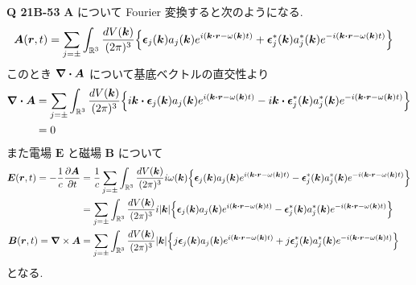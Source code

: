 \documentclass[uplatex,dvipdfmx,a4paper,11pt]{jlreq}
\newcommand{\RR}{\mathbb{R}}
\newcommand{\EE}{\bm{E}}
\newcommand{\BB}{\bm{B}}
\renewcommand{\AA}{\bm{A}}
\newcommand{\rr}{\bm{r}}
\newcommand{\kk}{\bm{k}}
\theoremstyle{definition}
\begin{document}
\textbf{Q 21B-53}
$\AA$ について Fourier 変換すると次のようになる.
\begin{align}
  \AA(\rr, t) & = \sum_{j=\pm}\int_{\RR^3}\frac{dV(\kk)}{(2\pi)^3}\qty{\ee_j(\kk)a_j(\kk)e^{i(\kk\vdot\rr - \omega(\kk)t)} + \ee_j^*(\kk)a_j^*(\kk)e^{-i(\kk\vdot\rr - \omega(\kk)t)}}
\end{align}
このとき $\vnabla\vdot\AA$ について基底ベクトルの直交性より
\begin{align}
  \vnabla\vdot\AA & = \sum_{j=\pm}\int_{\RR^3}\frac{dV(\kk)}{(2\pi)^3}\qty{i\kk\vdot\ee_j(\kk)a_j(\kk)e^{i(\kk\vdot\rr - \omega(\kk)t)} - i\kk\vdot\ee_j^*(\kk)a_j^*(\kk)e^{-i(\kk\vdot\rr - \omega(\kk)t)}} \\
                  & = 0
\end{align}
また電場 $\EE$ と磁場 $\BB$ について
\begin{align}
  \EE(\rr, t) = -\frac{1}{c}\pdv{\AA}{t} & = \frac{1}{c}\sum_{j=\pm}\int_{\RR^3}\frac{dV(\kk)}{(2\pi)^3}i\omega(\kk)\qty{\ee_j(\kk)a_j(\kk)e^{i(\kk\vdot\rr - \omega(\kk)t)} - \ee_j^*(\kk)a_j^*(\kk)e^{-i(\kk\vdot\rr - \omega(\kk)t)}} \\
                                         & = \sum_{j=\pm}\int_{\RR^3}\frac{dV(\kk)}{(2\pi)^3}i|\kk|\qty{\ee_j(\kk)a_j(\kk)e^{i(\kk\vdot\rr - \omega(\kk)t)} - \ee_j^*(\kk)a_j^*(\kk)e^{-i(\kk\vdot\rr - \omega(\kk)t)}}                  \\
  \BB(\rr, t) = \vnabla\times\AA         & = \sum_{j=\pm}\int_{\RR^3}\frac{dV(\kk)}{(2\pi)^3}|\kk|\qty{j\ee_j(\kk)a_j(\kk)e^{i(\kk\vdot\rr - \omega(\kk)t)} + j\ee_j^*(\kk)a_j^*(\kk)e^{-i(\kk\vdot\rr - \omega(\kk)t)}}
\end{align}
となる. \\
\end{document}
